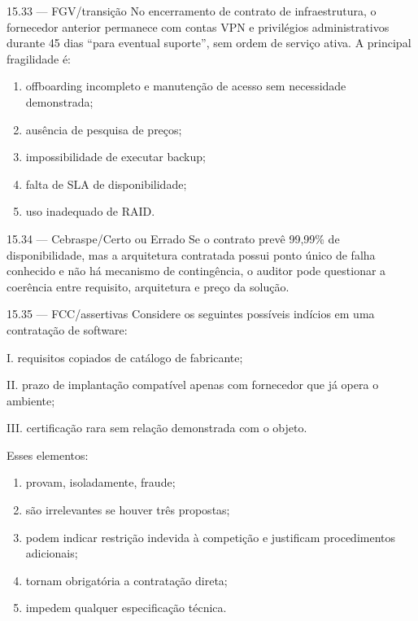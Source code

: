 \begin{questao}{ 15.33 — FGV/transição}
No encerramento de contrato de infraestrutura, o fornecedor anterior permanece com contas VPN e privilégios administrativos durante 45 dias ``para eventual suporte'', sem ordem de serviço ativa. A principal fragilidade é:
\begin{enumerate}[label=\Alph*)]
\item offboarding incompleto e manutenção de acesso sem necessidade demonstrada;
\item ausência de pesquisa de preços;
\item impossibilidade de executar backup;
\item falta de SLA de disponibilidade;
\item uso inadequado de RAID.
\end{enumerate}
\end{questao}

\begin{questao}{ 15.34 — Cebraspe/Certo ou Errado}
Se o contrato prevê 99,99\% de disponibilidade, mas a arquitetura contratada possui ponto único de falha conhecido e não há mecanismo de contingência, o auditor pode questionar a coerência entre requisito, arquitetura e preço da solução.
\end{questao}

\begin{questao}{ 15.35 — FCC/assertivas}
Considere os seguintes possíveis indícios em uma contratação de software:

I. requisitos copiados de catálogo de fabricante;

II. prazo de implantação compatível apenas com fornecedor que já opera o ambiente;

III. certificação rara sem relação demonstrada com o objeto.

Esses elementos:
\begin{enumerate}[label=\Alph*)]
\item provam, isoladamente, fraude;
\item são irrelevantes se houver três propostas;
\item podem indicar restrição indevida à competição e justificam procedimentos adicionais;
\item tornam obrigatória a contratação direta;
\item impedem qualquer especificação técnica.
\end{enumerate}
\end{questao}

